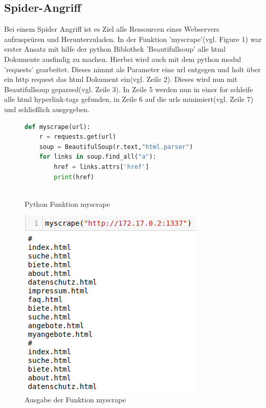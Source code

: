 \documentclass[12pt]{article}
\begin{document}
\subsection{Spider-Angriff}
Bei einem Spider Angriff ist es Ziel alle Ressourcen eines Webservers aufzusprüren und Herunterzuladen.
In der Funktion 'myscrape'(vgl. Figure 1) war erster Ansatz mit hilfe der python Biblothek 'Beautifullsoup' alle html Dokumente ausfindig zu machen.
Hierbei wird auch mit dem python modul 'requests' gearbeitet. Dieses nimmt als Parameter eine url entgegen und holt über ein http request das html Dokument ein(vgl. Zeile 2). Dieses wird nun mit Beautifullsoup geparsed(vgl. Zeile 3). In Zeile 5 werden nun in einer for schleife alle html hyperlink-tags gefunden, in Zeile 6 auf die urls minimiert(vgl. Zeile 7) und schließlich ausgegeben.
\begin{figure}[h]
 \caption{Python Funktion myscrape}
 \begin{lstlisting}[language=python, style=code]
 def myscrape(url):
 	r = requests.get(url)
 	soup = BeautifulSoup(r.text,"html.parser")
	for links in soup.find_all("a"):
	 	href = links.attrs['href']
	 	print(href)
  
 \end{lstlisting}

\end{figure}
\begin{figure}[h]
 \caption{Ausgabe der Funktion myscrape}
 \centering
 \vspace{3mm}
 \includegraphics[scale=0.4]{data/myscrape.png}
 \end{figure}
\end{document}

